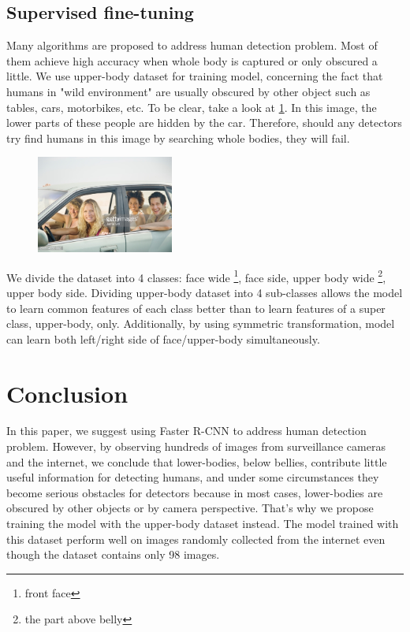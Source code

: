 \documentclass[conference]{IEEEtran}
\begin{document}
\subsection{Supervised fine-tuning}
Many algorithms are proposed to address human detection problem. Most of them achieve high accuracy when whole body is captured or only obscured a little. We use upper-body dataset for training model, concerning the fact that humans in "wild environment" are usually obscured by other object such as tables, cars, motorbikes, etc. To be clear, take a look at \ref{fig:h_exp1}. In this image, the lower parts of these people are hidden by the car. Therefore, should any detectors try find humans in this image by searching whole bodies, they will fail.
\begin{figure}
	\centering
	\includegraphics[width = 0.4\textwidth]{img7}
	\caption{}
	\label{fig:h_exp1}
\end{figure}

We divide the dataset into 4 classes: face wide \footnote{front face}, face side, upper body wide \footnote{the part above belly}, upper body side. Dividing upper-body dataset into 4 sub-classes allows the model to learn common features of each class better than to learn features of a super class, upper-body, only. Additionally, by using symmetric transformation, model can learn both left/right side of face/upper-body simultaneously.
\FloatBarrier


\section{Conclusion}

In this paper, we suggest using Faster R-CNN to address human detection problem. However, by observing hundreds of images from surveillance cameras and the internet, we conclude that lower-bodies, below bellies, contribute little useful information for detecting humans, and under some circumstances they become serious obstacles for detectors because in most cases, lower-bodies are obscured by other objects or by camera perspective. That's why we propose training the model with the upper-body dataset instead. The model trained with this dataset perform well on images randomly collected from the internet even though the dataset contains only 98 images. 
\end{document}
